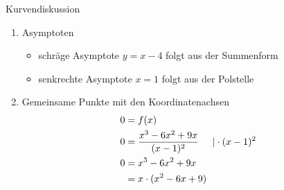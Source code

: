 \begin{bsp}{Kurvendiskussion}{}
\begin{enumerate}
\begin{enumerate}
\begin{equation*}
\begin{split}
         &= \lim_{x\longrightarrow \infty}  x-4+\dfrac{4}{(x-1)^2}\\
         &= \infty
    \end{split}
\end{equation*}
 \item Verhalten für $x\longrightarrow -\infty$
      \begin{equation*}
    \begin{split}
        \lim_{x\longrightarrow -\infty} f(x) &= \lim_{x\longrightarrow -\infty} \dfrac{x^3-6x^2+9x}{(x-1)^2} \\
         &= \lim_{x\longrightarrow -\infty}  x-4+\dfrac{4}{(x-1)^2}\\
         &= -\infty
    \end{split}
\end{equation*}
\item Verhalten an der Definitionslücke
      \begin{equation*}
    \begin{split}
        \lim_{x\longrightarrow 1^-} f(x) &= \lim_{x\longrightarrow 1^-} \dfrac{x^3-6x^2+9x}{(x-1)^2} \\
         &= \infty\\
         \lim_{x\longrightarrow 1^+} f(x) &= \lim_{x\longrightarrow 1^+} \dfrac{x^3-6x^2+9x}{(x-1)^2} \\
         &= \infty
    \end{split}
\end{equation*}
Daraus folgt, dass an der Stelle $x=1$ eine Polstelle (Unendlichkeitsstelle) ohne Vorzeichenwechsel (VZW) vorliegt.
 \end{enumerate}
 \item Asymptoten
 \begin{itemize}
     \item schräge Asymptote $y= x-4$ folgt aus der Summenform
     \item senkrechte Asymptote $x=1$ folgt aus der Polstelle
 \end{itemize}
 \item Gemeinsame Punkte mit den Koordinatenachsen
 \begin{equation*}
    \begin{split}
        0 &= f(x)\\
         0 &= \dfrac{x^3-6x^2+9x}{(x-1)^2} \hspace{0.5cm} | \cdot (x-1)^2\\
         0&= x^3-6x^2+9x\\
         &= x\cdot(x^2-6x+9)\\

\end{split}
\end{equation*}
\end{enumerate}
\end{bsp}
